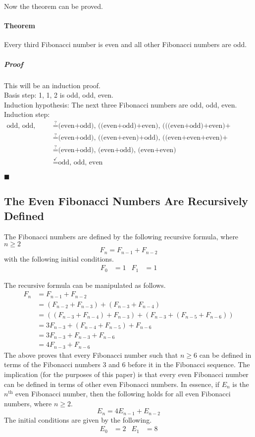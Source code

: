 \documentclass[titlepage]{article}
\newcommand{\qed}{
    \begin{flushright}
        $\blacksquare$
    \end{flushright}
}
\newcounter{theorem}
\newenvironment{theorem}[2]{
    \setenumerate{itemindent=15pt}
    \refstepcounter{theorem}\label{#1}
    \paragraph{Theorem \thetheorem}\hangindent=15pt #2

    \setlength{\leftskip}{15pt}
    \subparagraph{\hspace{-15pt}Proof}
}{

    \setlength{\leftskip}{0pt}
    \qed
}
\begin{document}
Now the theorem can be proved.
\begin{theorem}{trm:even3Fibonacci}{
    Every third Fibonacci number is even and all other Fibonacci numbers are odd.
}
    This will be an induction proof.\\
    Basis step: 1, 1, 2 is odd, odd, even.\\
    Induction hypothesis: The next three Fibonacci numbers are odd, odd, even.\\
    Induction step:
    \begin{align*}
        \text{odd, odd, even} &\stackrel{?}{=} \text{(even+odd), ((even+odd)+even), (((even+odd)+even)+(even+odd))}\\
        &\stackrel{?}{=} \text{(even+odd), ((even+even)+odd), ((even+even+even)+(odd+odd))}\\
        &\stackrel{?}{=} \text{(even+odd), (even+odd), (even+even)}\\
        &\stackrel{\checkmark}{=} \text{odd, odd, even}
    \end{align*}
\end{theorem}


\subsection{The Even Fibonacci Numbers Are Recursively Defined}\label{sss:evenRecursive}
The Fibonacci numbers are defined by the following recursive formula, where $n\geq 2$
\begin{equation*}
    F_n = F_{n-1}+F_{n-2}
\end{equation*}
with the following initial conditions.
\begin{align*}
    F_0 &= 1&
        F_1 &= 1
\end{align*}\par
The recursive formula can be manipulated as follows.
\begin{align*}
    F_n &= F_{n-1}+F_{n-2}\\
    &= (F_{n-2}+F_{n-3})+(F_{n-3}+F_{n-4})\\
    &= ((F_{n-3}+F_{n-4})+F_{n-3})+(F_{n-3}+(F_{n-5}+F_{n-6}))\\
    &= 3F_{n-3}+(F_{n-4}+F_{n-5})+F_{n-6}\\
    &= 3F_{n-3}+F_{n-3}+F_{n-6}\\
    &= 4F_{n-3}+F_{n-6}
\end{align*}
The above proves that every Fibonacci number such that $n\geq 6$ can be defined in terms of the Fibonacci numbers 3 and 6 before it in the Fibonacci sequence. The implication (for the purposes of this paper) is that every even Fibonacci number can be defined in terms of other even Fibonacci numbers. In essence, if $E_n$ is the $n^\text{th}$ even Fibonacci number, then the following holds for all even Fibonacci numbers, where $n\geq 2$.
\begin{equation*}
    E_n = 4E_{n-1}+E_{n-2}
\end{equation*}
The initial conditions are given by the following.
\begin{align*}
    E_0 &= 2&
        E_1 &= 8
\end{align*}
\newpage
\end{document}
